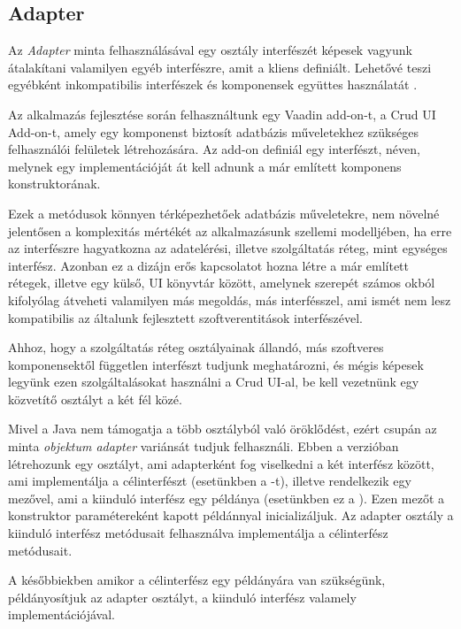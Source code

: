\subsection{Adapter}

Az \emph{Adapter} minta felhasználásával egy osztály interfészét képesek vagyunk átalakítani valamilyen egyéb interfészre, amit a kliens definiált. Lehetővé teszi egyébként inkompatibilis interfészek és komponensek együttes használatát \cite{gamma1995elements}. \par

Az alkalmazás fejlesztése során felhasználtunk egy Vaadin add-on-t, a Crud UI Add-on-t, amely egy komponenst biztosít adatbázis műveletekhez szükséges felhasználói felületek létrehozására. Az add-on definiál egy interfészt,  néven, melynek egy implementációját át kell adnunk a már említett komponens konstruktorának.


Ezek a metódusok könnyen térképezhetőek adatbázis műveletekre, nem növelné jelentősen a komplexitás mértékét az alkalmazásunk szellemi modelljében, ha erre az interfészre hagyatkozna az adatelérési, illetve szolgáltatás réteg, mint egységes interfész. Azonban ez a dizájn erős kapcsolatot hozna létre a már említett rétegek, illetve egy külső, UI könyvtár között, amelynek szerepét számos okból kifolyólag átveheti valamilyen más megoldás, más interfésszel, ami ismét nem lesz kompatibilis az általunk fejlesztett szoftverentitások interfészével. \par


Ahhoz, hogy a szolgáltatás réteg osztályainak állandó, más szoftveres komponensektől független interfészt tudjunk meghatározni, és mégis képesek legyünk ezen szolgáltalásokat használni a Crud UI-al, be kell vezetnünk egy közvetítő osztályt a két fél közé. \par

Mivel a Java nem támogatja a több osztályból való öröklődést, ezért csupán az  minta \emph{objektum adapter} variánsát tudjuk felhasználi. Ebben a verzióban létrehozunk egy osztályt, ami adapterként fog viselkedni a két interfész között, ami implementálja a célinterfészt (esetünkben a -t), illetve rendelkezik egy mezővel, ami a kiinduló interfész egy példánya (esetünkben ez a ). Ezen mezőt a konstruktor paramétereként kapott példánnyal inicializáljuk. Az adapter osztály a kiinduló interfész metódusait felhasználva implementálja a célinterfész metódusait. \par


A későbbiekben amikor a célinterfész egy példányára van szükségünk, példányosítjuk az adapter osztályt, a kiinduló interfész valamely implementációjával.

